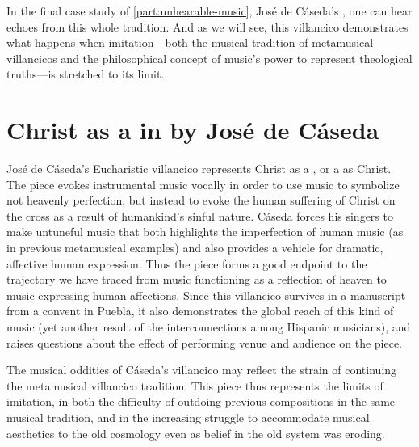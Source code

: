 In the final case study of \cref{part:unhearable-music}, José de Cáseda's , one can hear echoes from this whole tradition.
And as we will see, this villancico demonstrates what happens when imitation---both the musical tradition of metamusical villancicos and the philosophical concept of music's power to represent theological truths---is stretched to its limit.

\section{Christ as a  in  by José de Cáseda}
\label{sec:Caseda}

José de Cáseda's Eucharistic villancico  represents Christ as a , or a  as Christ.
The piece evokes instrumental music vocally in order to use music to symbolize not heavenly perfection, but instead to evoke the human suffering of Christ on the cross as a result of humankind's sinful nature.
Cáseda forces his singers to make untuneful music that both highlights the imperfection of human music (as in previous metamusical examples) and also provides a vehicle for dramatic, affective human expression. 
Thus the piece forms a good endpoint to the trajectory we have traced from music functioning as a reflection of heaven to music expressing human affections.
Since this villancico survives in a manuscript from a convent in Puebla, it also demonstrates the global reach of this kind of music (yet another result of the interconnections among Hispanic musicians), and raises questions about the effect of performing venue and audience on the piece.

The musical oddities of Cáseda's villancico may reflect the strain of continuing the metamusical villancico tradition.
This piece thus represents the limits of imitation, in both the difficulty of outdoing previous compositions in the same musical tradition, and in the increasing struggle to accommodate musical aesthetics to the old cosmology even as belief in the old system was eroding.

